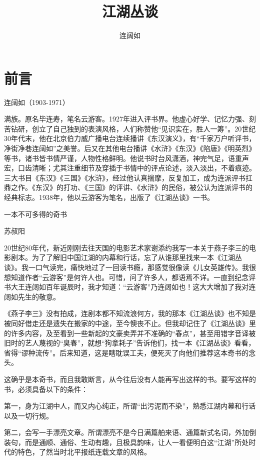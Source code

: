 \documentclass[12pt,UTF8]{ctexbook}
\title{\heiti\zihao{0} 江湖丛谈}
\author{连阔如}
\date{}
\begin{document}
\maketitle
\tableofcontents

\frontmatter

\chapter{前言}

连阔如（1903-1971）

满族。原名毕连寿，笔名云游客。1927年进入评书界。他虚心好学、记忆力强、刻苦钻研，创立了自己独到的表演风格，人们称赞他“见识实在，胜人一筹”。20世纪30年代末，他在北京伯力威广播电台连续播讲《东汉演义》，有“千家万户听评书，净街净巷连阔如”之美誉。后又在其他电台播讲《水浒》《东汉》《陷唐》《明英烈》等书，诸书皆书情严谨，人物性格鲜明。他说书时台风潇酒，神完气足，语重声宏，口齿清晰；尤其注重细节及穿插于书情中的评点论述，淡入淡出，不着痕迹。三大书目《东汉》《三国》《水浒》，经过他认真揣摩，反复加工，成为连派评书扛鼎之作。《东汉》的打功、《三国》的评讲、《水浒》的民俗，被公认为连派评书的经典标志。1938年，他以云游客为笔名，出版了《江湖丛谈》一书。





一本不可多得的奇书


苏叔阳

20世纪80年代，新近刚刚去往天国的电影艺术家谢添约我写一本关于燕子李三的电影剧本。为了了解旧中国江湖的内幕和行话，忘了从谁那里找来一本《江湖丛谈》。我一口气读完，痛快地过了一回读书瘾，那感觉很像读《儿女英雄传》。我很想知道作者“云游客”是何许人也。可惜，问了许多人，都语焉不详。一直到纪念评书大王连阔如百年诞辰时，我才知道：“云游客”乃连阔如也！这大大增加了我对连阔如先生的敬意。

《燕子李三》没有拍成，连剧本都不知流浪何方，我的那本《江湖丛谈》也不知是被同好借走还是遗失在搬家的中途，至今懊丧不止。但我却记住了《江湖丛谈》里的许多内容，及至看到一些新起的文豪卖弄并不准确的“春点”，甚至用错字音译被旧时的艺人蔑视的“臭春”，就想“狗拿耗子”告诉他们，找一本《江湖丛谈》看看，省得“谬种流传”。后来知道，这是瞎耽误工夫，便死灭了向他们推荐这本奇书的念头。

这确乎是本奇书，而且我敢断言，从今往后没有人能再写出这样的书。要写这样的书，必须具备以下的条件：

第一，身为江湖中人，而又内心纯正，所谓“出污泥而不染”，熟悉江湖内幕和行话以及一切行规。

第二，会写一手漂亮文章。所谓漂亮不是今日满篇舶来语、通篇新式名词，外加倒装句，而是通顺、通俗、生动有趣，且极具韵味，让人一看便明白这“江湖”所处时代的特色，了然当时北平报纸连载文章的风格。
\end{document}
